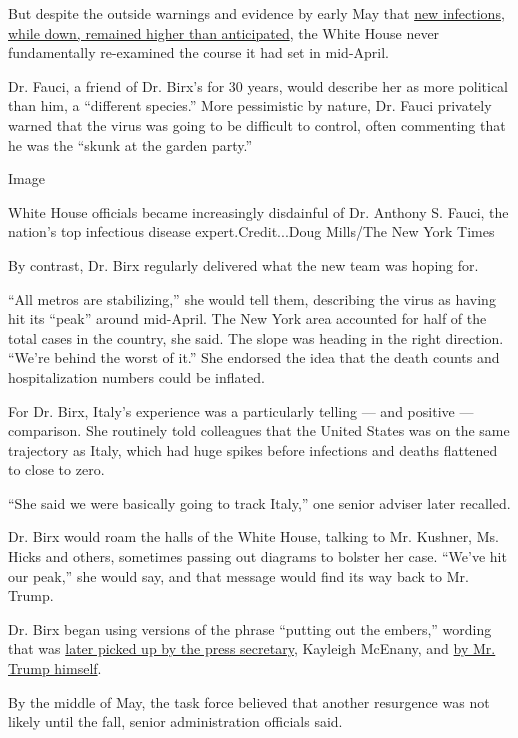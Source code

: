 But despite the outside warnings and evidence by early May that
\href{https://www.nytimes.com/interactive/2020/us/coronavirus-us-cases.html}{new
infections, while down, remained higher than anticipated}, the White
House never fundamentally re-examined the course it had set in
mid-April.

Dr. Fauci, a friend of Dr. Birx's for 30 years, would describe her as
more political than him, a ``different species.'' More pessimistic by
nature, Dr. Fauci privately warned that the virus was going to be
difficult to control, often commenting that he was the ``skunk at the
garden party.''

Image

White House officials became increasingly disdainful of Dr. Anthony S.
Fauci, the nation's top infectious disease expert.Credit...Doug
Mills/The New York Times

By contrast, Dr. Birx regularly delivered what the new team was hoping
for.

``All metros are stabilizing,'' she would tell them, describing the
virus as having hit its ``peak'' around mid-April. The New York area
accounted for half of the total cases in the country, she said. The
slope was heading in the right direction. ``We're behind the worst of
it.'' She endorsed the idea that the death counts and hospitalization
numbers could be inflated.

For Dr. Birx, Italy's experience was a particularly telling --- and
positive --- comparison. She routinely told colleagues that the United
States was on the same trajectory as Italy, which had huge spikes before
infections and deaths flattened to close to zero.

``She said we were basically going to track Italy,'' one senior adviser
later recalled.

Dr. Birx would roam the halls of the White House, talking to Mr.
Kushner, Ms. Hicks and others, sometimes passing out diagrams to bolster
her case. ``We've hit our peak,'' she would say, and that message would
find its way back to Mr. Trump.

Dr. Birx began using versions of the phrase ``putting out the embers,''
wording that was
\href{https://www.whitehouse.gov/briefings-statements/press-briefing-press-secretary-kayleigh-mcenany-062220/}{later
picked up by the press secretary}, Kayleigh McEnany, and
\href{https://twitter.com/realDonaldTrump/status/1276363261957603328?s=20}{by
Mr. Trump himself}.

By the middle of May, the task force believed that another resurgence
was not likely until the fall, senior administration officials said.

